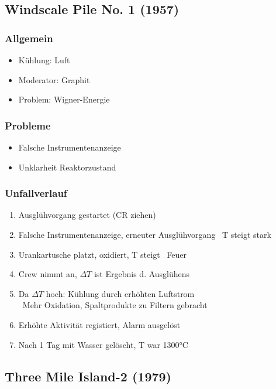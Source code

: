 \documentclass[12pt]{article}
\begin{document}
\subsection{Windscale Pile No. 1 (1957)}

\subsubsection{Allgemein}
\begin{itemize}
	\item Kühlung: Luft
	\item Moderator: Graphit
	\item Problem: Wigner-Energie
\end{itemize}

\subsubsection{Probleme}
\begin{itemize}
	\item Falsche Instrumentenanzeige
	\item Unklarheit Reaktorzustand
\end{itemize}

\subsubsection{Unfallverlauf}
\begin{enumerate}
	\item Ausglühvorgang gestartet (CR ziehen)
	\item Falsche Instrumentenanzeige, erneuter Ausglühvorgang \textrightarrow\ T steigt stark
	\item Urankartusche platzt, oxidiert, T steigt \textrightarrow\ Feuer
	\item Crew nimmt an, \(\Delta T\) ist Ergebnis d. Ausglühens
	\item Da \(\Delta T\) hoch: Kühlung durch erhöhten Luftstrom\\
		\textrightarrow\ Mehr Oxidation, Spaltprodukte zu Filtern gebracht
	\item Erhöhte Aktivität registiert, Alarm ausgelöst
	\item Nach 1 Tag mit Wasser gelöscht, T war 1300°C
\end{enumerate}

\subsection{Three Mile Island-2 (1979)}
\end{document}

